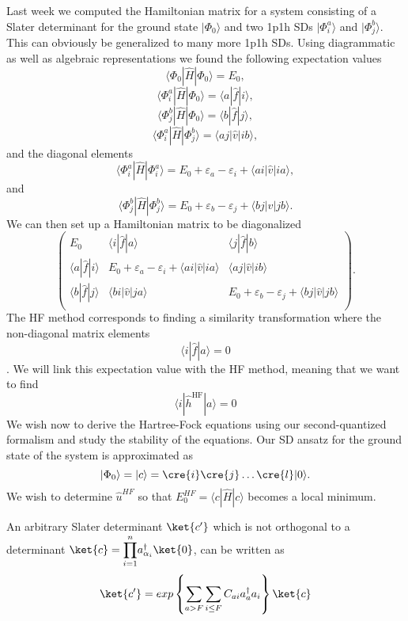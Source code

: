 Last week we computed the Hamiltonian matrix for a system consisting of a Slater determinant for the ground state 
$|\Phi_0 \rangle$ and two 1p1h SDs $|\Phi_i^a \rangle$ and $|\Phi_j^b \rangle$. This can obviously be generalized to many more 1p1h SDs.  Using diagrammatic as well as algebraic representations we found the following 
expectation values
\[ \langle \Phi_0 | \hat{H}|\Phi_0 \rangle = E_0, \]
\[ \langle \Phi_i^a | \hat{H}|\Phi_0 \rangle = \langle a | \hat{f} | i \rangle,\]
\[ \langle \Phi_j^b | \hat{H}|\Phi_0 \rangle = \langle b | \hat{f} | j \rangle,\]
\[\langle \Phi_i^a | \hat{H}|\Phi_j^b \rangle = \langle aj | \hat{v} | ib \rangle,\]
and the diagonal elements
\[ \langle \Phi_i^a | \hat{H}|\Phi_i^a \rangle = E_0+\varepsilon_{a}-\varepsilon_{i}+\langle ai | \hat{v} | ia \rangle,\]
and 
\[ \langle \Phi_j^b | \hat{H}|\Phi_j^b \rangle =E_0+\varepsilon_{b}-\varepsilon_{j}+\langle bj | \hat{v} | jb \rangle.\]
We can then set up a Hamiltonian matrix to be diagonalized
\[
 \left( \begin{array}{ccc} 
               E_0  & \langle i | \hat{f} | a \rangle &  \langle j | \hat{f} | b\rangle\\
               \langle a | \hat{f} | i \rangle  &E_0+\varepsilon_{a}-\varepsilon_{i}+\langle ai | \hat{v} | ia \rangle  & \langle aj | \hat{v} | ib \rangle      \\
               \langle b | \hat{f} | j \rangle  & \langle bi | \hat{v} | ja \rangle &E_0+\varepsilon_{b}-\varepsilon_{j}+\langle bj | \hat{v} | jb \rangle         \\
             \end{array} \right) .
\]
The HF method corresponds to finding a similarity transformation where the non-diagonal matrix elements
\[\langle i | \hat{f} | a \rangle=0\].   We will link this expectation value with the HF method, meaning that
we want to find
\[\langle i | \hat{h}^{\mathrm{HF}}| a \rangle=0\]
We wish now to derive the Hartree-Fock equations using our second-quantized formalism and study the stability of the equations. 
Our SD ansatz for the ground state of the system is approximated as
\[   |\Phi_0\rangle = |c\rangle = \cre{i} \cre{j}\dots\cre{l}|0\rangle.\]
We wish to determine $\hat{u}^{HF}$ so that 
$E_0^{HF}= \langle c|\hat{H}| c\rangle$ becomes a local minimum. 


An arbitrary Slater determinant $\ket{c'}$ which is not orthogonal to a determinant
$\ket{c}={\displaystyle\prod_{i=1}^{n}}
a_{\alpha_{i}}^{\dagger}\ket{0}$, can be written as
\[
\ket{c'}=exp\left\{\sum_{a>F}\sum_{i\le F}C_{ai}a_{a}^{\dagger}
a_{i}\right\}\ket{c}
\]

